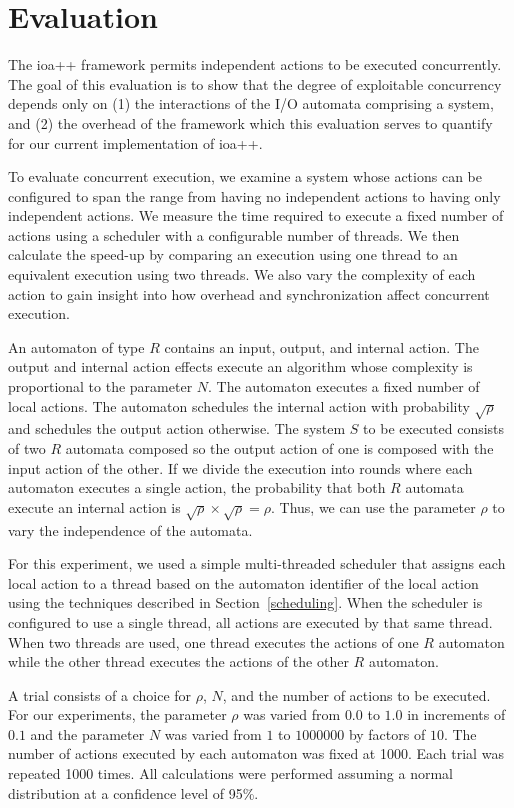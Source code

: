 \section{Evaluation\label{evaluation}}

The ioa++ framework permits independent actions to be executed concurrently.
The goal of this evaluation is to show that the degree of exploitable concurrency depends only on (1) the interactions of the I/O automata comprising a system, and (2) the overhead of the framework which this evaluation serves to quantify for our current implementation of ioa++.

To evaluate concurrent execution, we examine a system whose actions can be configured to span the range from having no independent actions to having only independent actions.
We measure the time required to execute a fixed number of actions using a scheduler with a configurable number of threads.
We then calculate the speed-up by comparing an execution using one thread to an equivalent execution using two threads.
We also vary the complexity of each action to gain insight into how overhead and synchronization affect concurrent execution.

An automaton of type $R$ contains an input, output, and internal action.
The output and internal action effects execute an algorithm whose complexity is proportional to the parameter $N$.
The automaton executes a fixed number of local actions.
The automaton schedules the internal action with probability $\sqrt{\rho}$ and schedules the output action otherwise.
The system $S$ to be executed consists of two $R$ automata composed so the output action of one is composed with the input action of the other.
If we divide the execution into rounds where each automaton executes a single action, the probability that both $R$ automata execute an internal action is $\sqrt{\rho} \times \sqrt{\rho} = \rho$.
Thus, we can use the parameter $\rho$ to vary the independence of the automata.

For this experiment, we used a simple multi-threaded scheduler that assigns each local action to a thread based on the automaton identifier of the local action using the techniques described in Section~\ref{scheduling}.
When the scheduler is configured to use a single thread, all actions are executed by that same thread.
When two threads are used, one thread executes the actions of one $R$ automaton while the other thread executes the actions of the other $R$ automaton.

A trial consists of a choice for $\rho$, $N$, and the number of actions to be executed.
For our experiments, the parameter $\rho$ was varied from $0.0$ to $1.0$ in increments of $0.1$ and the parameter $N$ was varied from $1$ to $1000000$ by factors of $10$.
The number of actions executed by each automaton was fixed at 1000.
Each trial was repeated 1000 times.
All calculations were performed assuming a normal distribution at a confidence level of 95\%.

